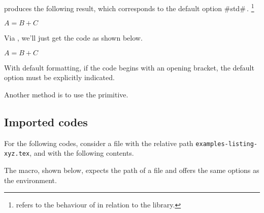 

\begin{tdocexa}[Following]
     produces the following result, which corresponds to the default option \tdoclatexin#std#\,.
    \footnote{
         refers to the  behaviour of  in relation to the  library.
    }

    \begin{tdoclatex}
        $A = B + C$
    \end{tdoclatex}
\end{tdocexa}




\begin{tdocexa}
    Via , we'll just get the code as shown below.

    \begin{tdoclatex}[code]
        $A = B + C$
    \end{tdoclatex}
\end{tdocexa}




\begin{tdocwarn}
    With default formatting, if the code begins with an opening bracket, the default option must be explicitly indicated.


    \smallskip

    Another method is to use the  primitive.

\end{tdocwarn}


\subsection{Imported codes}

For the following codes, consider a file with the relative path \verb+examples-listing-xyz.tex+, and with the following contents.



\medskip

The  macro, shown below, expects the path of a file and offers the same options as the  environment.




